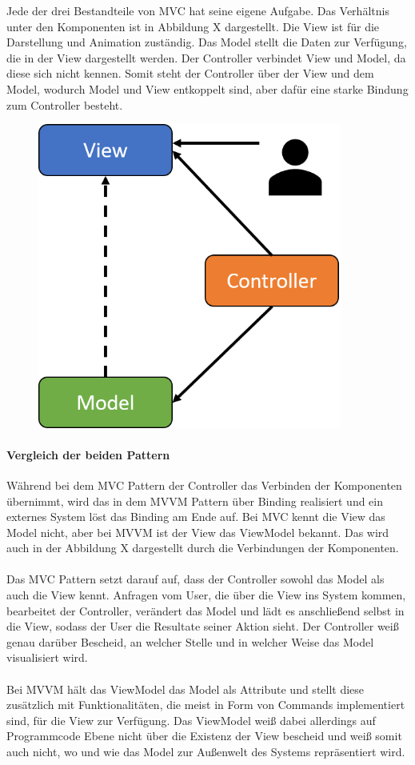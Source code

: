 \documentclass[titlepage=false,12pt]{scrreprt}
\begin{document}
Jede der drei Bestandteile von MVC hat seine eigene Aufgabe. Das Verhältnis unter den Komponenten
ist in Abbildung X dargestellt. Die View ist für die Darstellung und
Animation zuständig. Das Model stellt die Daten zur Verfügung, die in der View dargestellt werden.
Der Controller verbindet View und Model, da diese sich nicht kennen. Somit steht der Controller 
über der View und dem Model, wodurch Model und View entkoppelt sind, aber dafür eine starke Bindung
zum Controller besteht. 

\begin{figure}
	\includegraphics[width=10cm]{MVC_User.png}
\end{figure}

\paragraph{Vergleich der beiden Pattern}

Während bei dem MVC Pattern der Controller das Verbinden der Komponenten übernimmt, wird das
in dem MVVM Pattern über Binding realisiert und ein externes System löst das Binding am Ende auf.
Bei MVC kennt die View das Model nicht, aber bei MVVM ist der View das ViewModel bekannt.
Das wird auch in der Abbildung X dargestellt durch die Verbindungen der Komponenten.\\
\\
\noindent
Das MVC Pattern setzt darauf auf, dass der Controller sowohl das Model als auch die View kennt. Anfragen vom User,
die über die View ins System kommen, bearbeitet der Controller, verändert das Model und lädt es anschließend selbst
in die View, sodass der User die Resultate seiner Aktion sieht. Der Controller weiß genau darüber Bescheid, an welcher Stelle
und in welcher Weise das Model visualisiert wird.\\
\\
\noindent
Bei MVVM hält das ViewModel das Model als Attribute und stellt diese zusätzlich mit Funktionalitäten, die meist in Form von Commands
implementiert sind, für die View zur Verfügung. Das ViewModel weiß dabei allerdings auf Programmcode Ebene nicht über die Existenz der View
bescheid und weiß somit auch nicht, wo und wie das Model zur Außenwelt des Systems repräsentiert wird.
\end{document}
